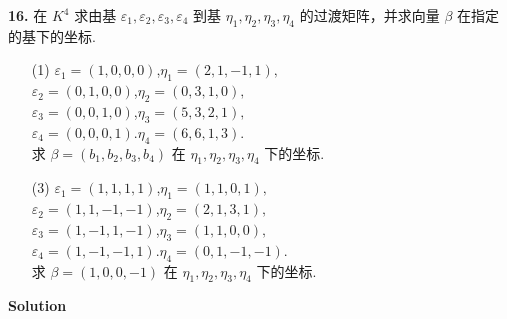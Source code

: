 \documentclass[11pt,a4paper,openany,oneside]{book}
\newcommand\Solution{\noindent\textbf{\textsf{Solution}}\par\medskip}
\begin{document}
\begin{myexample}
\textbf{16.}
在 $ K^4 $ 求由基 $ \varepsilon_1, \varepsilon_2, \varepsilon_3, \varepsilon_4 $ 到基 $ \eta_1, \eta_2, \eta_3, \eta_4 $ 的过渡矩阵，并求向量 $ \beta $ 在指定的基下的坐标. 
\begin{enumerate}

\item[(1)]  
	$\varepsilon_1 = (1, 0, 0, 0)$,\hspace{1.2em}$ \eta_1 = (2, 1, -1, 1),$\\ 
	$\varepsilon_2 = (0, 1, 0, 0)$,\hspace{1.2em}$ \eta_2 = (0, 3, 1, 0), $\\ 
	$\varepsilon_3 = (0, 0, 1, 0)$,\hspace{1.2em}$ \eta_3 = (5, 3, 2, 1), $\\  
	$\varepsilon_4 = (0 ,0, 0, 1)$.\hspace{1.2em}$ \eta_4 = (6 ,6, 1, 3). $\\ 
求 $ \beta = (b_1, b_2, b_3, b_4) $ 在 $ \eta_1, \eta_2, \eta_3, \eta_4 $ 下的坐标.

\item[(3)]
	$\varepsilon_1 = (1, 1, 1, 1)$,\hspace{2.7em}$ \eta_1 = (1, 1, 0, 1),$\\ 
    $\varepsilon_2 = (1, 1, -1, -1)$,\hspace{1.2em}$ \eta_2 = (2, 1, 3, 1), $\\ 
    $\varepsilon_3 = (1, -1, 1, -1)$,\hspace{1.2em}$ \eta_3 = (1, 1, 0, 0), $\\  
    $\varepsilon_4 = (1 ,-1, -1, 1)$.\hspace{1.2em}$ \eta_4 = (0 ,1, -1, -1). $\\ 
求 $ \beta = (1, 0, 0, -1) $ 在 $ \eta_1, \eta_2, \eta_3, \eta_4 $ 下的坐标. \\
\end{enumerate}

\end{myexample}
\Solution
\end{document}
